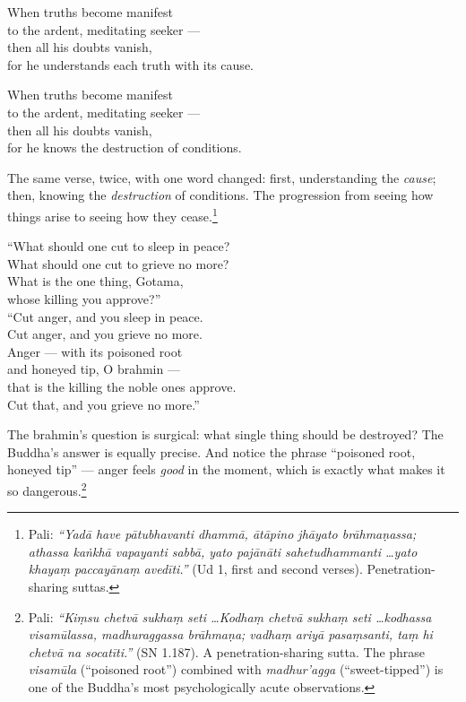 \begin{versebox}
When truths become manifest\\
to the ardent, meditating seeker ---\\
then all his doubts vanish,\\
for he understands each truth with its cause.
\end{versebox}

\begin{versebox}
When truths become manifest\\
to the ardent, meditating seeker ---\\
then all his doubts vanish,\\
for he knows the destruction of conditions.
\end{versebox}

\noindent The same verse, twice, with one word changed: first, understanding the \textit{cause}; then, knowing the \textit{destruction} of conditions. The progression from seeing how things arise to seeing how they cease.\footnote{Pali: \textit{``Yadā have pātubhavanti dhammā, ātāpino jhāyato brāhmaṇassa; athassa kaṅkhā vapayanti sabbā, yato pajānāti sahetudhammanti \ldots yato khayaṃ paccayānaṃ avedīti.''} (Ud 1, first and second verses). Penetration-sharing suttas.}

\begin{versebox}
``What should one cut to sleep in peace?\\
What should one cut to grieve no more?\\
What is the one thing, Gotama,\\
whose killing you approve?''\\[6pt]
``Cut anger, and you sleep in peace.\\
Cut anger, and you grieve no more.\\
Anger --- with its poisoned root\\
and honeyed tip, O brahmin ---\\
that is the killing the noble ones approve.\\
Cut that, and you grieve no more.''
\end{versebox}

\noindent The brahmin's question is surgical: what single thing should be destroyed? The Buddha's answer is equally precise. And notice the phrase ``poisoned root, honeyed tip'' --- anger feels \textit{good} in the moment, which is exactly what makes it so dangerous.\footnote{Pali: \textit{``Kiṃsu chetvā sukhaṃ seti \ldots Kodhaṃ chetvā sukhaṃ seti \ldots kodhassa visamūlassa, madhuraggassa brāhmaṇa; vadhaṃ ariyā pasaṃsanti, taṃ hi chetvā na socatīti.''} (SN 1.187). A penetration-sharing sutta. The phrase \textit{visamūla} (``poisoned root'') combined with \textit{madhur'agga} (``sweet-tipped'') is one of the Buddha's most psychologically acute observations.}

